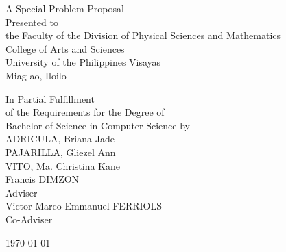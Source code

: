 \begin{titlepage}
\centering


\vspace{1.75cm}
A Special Problem Proposal\\
Presented to\\
the Faculty of the Division of Physical Sciences and Mathematics\\
College of Arts and Sciences\\
University of the Philippines Visayas\\
Miag-ao, Iloilo

\vspace{1.75cm}
In Partial Fulfillment\\
of the Requirements for the Degree of\\
Bachelor of Science in Computer Science
\vspace{1.75cm}
by\\

\vspace{1cm}
ADRICULA, Briana Jade  \\
PAJARILLA, Gliezel Ann  \\
VITO, Ma. Christina Kane  \\

\vspace{1.75cm}
Francis DIMZON \\
Adviser\\
Victor Marco Emmanuel FERRIOLS \\
Co-Adviser

\vspace{1.75cm}
\today
\end{titlepage}
